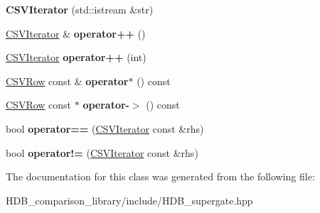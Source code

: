 \begin{DoxyCompactItemize}
{\bfseries C\+S\+V\+Iterator} (std\+::istream \&str)
\item 
\mbox{\label{classHDB__supergate___1_1CSVIterator_a9ebcc21a8141cff811115d5018365eac}} 
\hyperlink{classHDB__supergate___1_1CSVIterator}{C\+S\+V\+Iterator} \& {\bfseries operator++} ()
\item 
\mbox{\label{classHDB__supergate___1_1CSVIterator_a2e66c8e399a9c3cdb627dc0d7b4018ae}} 
\hyperlink{classHDB__supergate___1_1CSVIterator}{C\+S\+V\+Iterator} {\bfseries operator++} (int)
\item 
\mbox{\label{classHDB__supergate___1_1CSVIterator_ab6ab83ac0b004d45ff7aae0bafd96bf5}} 
\hyperlink{classHDB__supergate___1_1CSVRow}{C\+S\+V\+Row} const  \& {\bfseries operator$\ast$} () const
\item 
\mbox{\label{classHDB__supergate___1_1CSVIterator_aaf83672d49bb980dbb74244259dd5064}} 
\hyperlink{classHDB__supergate___1_1CSVRow}{C\+S\+V\+Row} const  $\ast$ {\bfseries operator-\/$>$} () const
\item 
\mbox{\label{classHDB__supergate___1_1CSVIterator_a966cad99a30b1410aff1364957f2a0c2}} 
bool {\bfseries operator==} (\hyperlink{classHDB__supergate___1_1CSVIterator}{C\+S\+V\+Iterator} const \&rhs)
\item 
\mbox{\label{classHDB__supergate___1_1CSVIterator_a0e1cce090126f2f875f844fa75498d2c}} 
bool {\bfseries operator!=} (\hyperlink{classHDB__supergate___1_1CSVIterator}{C\+S\+V\+Iterator} const \&rhs)
\end{DoxyCompactItemize}


The documentation for this class was generated from the following file\+:\begin{DoxyCompactItemize}
\item 
H\+D\+B\+\_\+comparison\+\_\+library/include/H\+D\+B\+\_\+supergate.\+hpp\end{DoxyCompactItemize}

